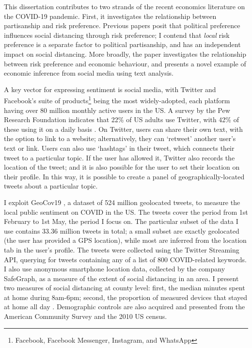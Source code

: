 \documentclass{article}
\begin{document}
This dissertation contributes to two strands of the recent economics literature on the COVID-19 pandemic. First, it investigates the relationship between partisanship and risk preference. Previous papers posit that political preference influences social distancing through risk preference; I contend that \textit{local} risk preference is a separate factor to political partisanship, and has an independent impact on social distancing. More broadly, the paper investigates the relationship between risk preference and economic behaviour, and presents a novel example of economic inference from social media using text analysis. 


A key vector for expressing sentiment is social media, with Twitter and Facebook's suite of products\footnote{Facebook, Facebook Messenger, Instagram, and WhatsApp} being the most widely-adopted, each platform having over 80 million monthly active users in the US. A survey by the Pew Research Foundation indicates that 22\% of US adults use Twitter, with 42\% of these using it on a daily basis \parencite{perrinShareAdultsUsing2019}. On Twitter, users can share their own text, with the option to link to a website; alternatively, they can `retweet' another user's text or link. Users can also use `hashtags' in their tweet, which connects their tweet to a particular topic. If the user has allowed it, Twitter also records the location of the tweet; and it is also possible for the user to set their location on their profile. In this way, it is possible to create a panel of geographically-located tweets about a particular topic. 

I exploit GeoCov19 \parencite{qaziGeoCoV19DatasetHundreds2020a}, a dataset of 524 million geolocated tweets, to measure the local public sentiment on COVID in the US. The tweets cover the period from 1st February to 1st May, the period I focus on. The particular subset of the data I use contains 33.36 million tweets in total; a small subset are exactly geolocated (the user has provided a GPS location), while most are inferred from the location tab in the user's profile. The tweets were collected using the Twitter Streaming API, querying for tweets containing any of a list of 800 COVID-related keywords. I also use anonymous smartphone location data, collected by the company SafeGraph, as a measure of the extent of social distancing in an area. I present two measures of social distancing at county level: first, the median minutes spent at home during 8am-6pm; second, the proportion of measured devices that stayed at home all day \parencite{safegraphinc.SocialDistancingMetrics2020}. Demographic controls are also acquired and presented from the American Community Survey and the 2010 US census. 
\end{document}
